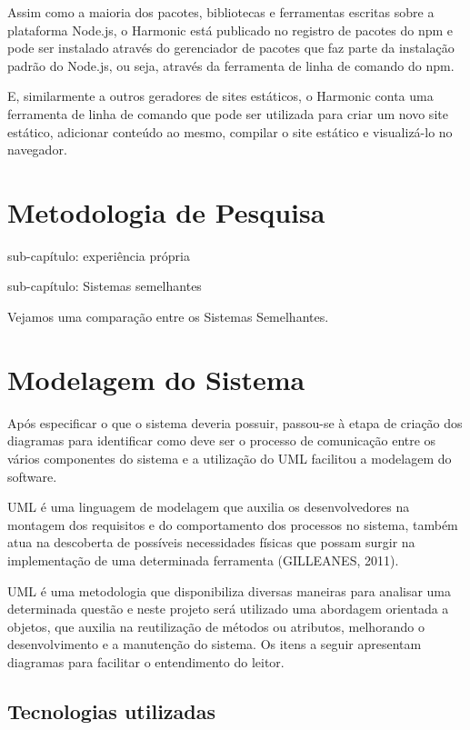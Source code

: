 \documentclass[ppginf, pep]{esinucpel}
\begin{document}
Assim como a maioria dos pacotes, bibliotecas e ferramentas escritas sobre a plataforma Node.js, o Harmonic está publicado no registro de pacotes do npm e pode ser instalado através do gerenciador de pacotes que faz parte da instalação padrão do Node.js, ou seja, através da ferramenta de linha de comando do npm.

E, similarmente a outros geradores de sites estáticos, o Harmonic conta uma ferramenta de linha de comando que pode ser utilizada para criar um novo site estático, adicionar conteúdo ao mesmo, compilar o site estático e visualizá-lo no navegador.

\chapter{Metodologia de Pesquisa}

sub-capítulo: experiência própria

sub-capítulo: Sistemas semelhantes

Vejamos uma comparação entre os Sistemas Semelhantes.

\chapter{Modelagem do Sistema}

Após especificar o que o sistema deveria possuir, passou-se à etapa de criação dos diagramas para identificar como deve ser o processo de comunicação entre os vários componentes do sistema e a utilização do UML facilitou a modelagem do software.

UML é uma linguagem de modelagem que auxilia os desenvolvedores na montagem dos requisitos e do comportamento dos processos no sistema, também atua na descoberta de possíveis necessidades físicas que possam surgir na implementação de uma determinada ferramenta (GILLEANES, 2011). %

UML é uma metodologia que disponibiliza diversas maneiras para analisar uma determinada questão e neste projeto será utilizado uma abordagem orientada a objetos, que auxilia na reutilização de métodos ou atributos, melhorando o desenvolvimento e a manutenção do sistema. Os itens a seguir apresentam diagramas para facilitar o entendimento do leitor.



\section{Tecnologias utilizadas}
\end{document}
